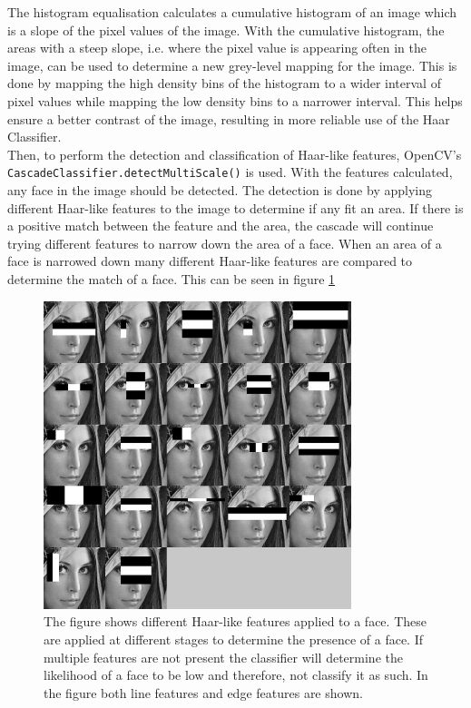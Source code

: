 The histogram equalisation calculates a cumulative histogram of an image which is a slope of the pixel values of the image. With the cumulative histogram, the areas with a steep slope, i.e. where the pixel value is appearing often in the image, can be used to determine a new grey-level mapping for the image. This is done by mapping the high density bins of the histogram to a wider interval of pixel values while mapping the low density bins to a narrower interval. This helps ensure a better contrast of the image, resulting in more reliable use of the Haar Classifier.\cite{imagebook}\\

Then, to perform the detection and classification of Haar-like features, OpenCV's \texttt{CascadeClassifier.detectMultiScale()} is used. With the features calculated, any face in the image should be detected.
The detection is done by applying different Haar-like features to the image to determine if any fit an area. If there is a positive match between the feature and the area, the cascade will continue trying different features to narrow down the area of a face. When an area of a face is narrowed down many different Haar-like features are compared to determine the match of a face. This can be seen in figure \ref{fig:Haar-featureFace}

\begin{figure}[H]
    \centering
    \includegraphics[width=0.8\textwidth]{figures/LenaHaarFeatures.jpg}
    \caption{The figure shows different Haar-like features applied to a face. These are applied at different stages to determine the presence of a face. If multiple features are not present the classifier will determine the likelihood of a face to be low and therefore, not classify it as such. In the figure both line features and edge features are shown.\cite{LenaHaarFeatures}}
    \label{fig:Haar-featureFace}
\end{figure}

